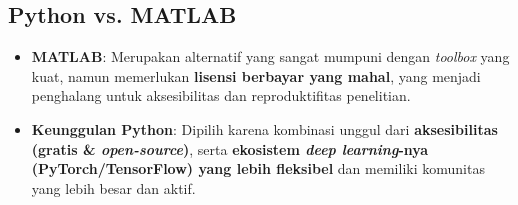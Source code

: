 \documentclass[12pt, a4paper]{article}
\newcommand{\subsectiontitle}[1]{\subsection*{\large\bfseries #1}}
\begin{document}
\subsectiontitle{Python vs. MATLAB}
\begin{itemize}
    \item \textbf{MATLAB}: Merupakan alternatif yang sangat mumpuni dengan \textit{toolbox} yang kuat, namun memerlukan \textbf{lisensi berbayar yang mahal}, yang menjadi penghalang untuk aksesibilitas dan reproduktifitas penelitian.
    \item \textbf{Keunggulan Python}: Dipilih karena kombinasi unggul dari \textbf{aksesibilitas (gratis \& \textit{open-source})}, serta \textbf{ekosistem \textit{deep learning}-nya (PyTorch/TensorFlow) yang lebih fleksibel} dan memiliki komunitas yang lebih besar dan aktif.
\end{itemize}

\printbibliography[title=Daftar Pustaka]
\end{document}
